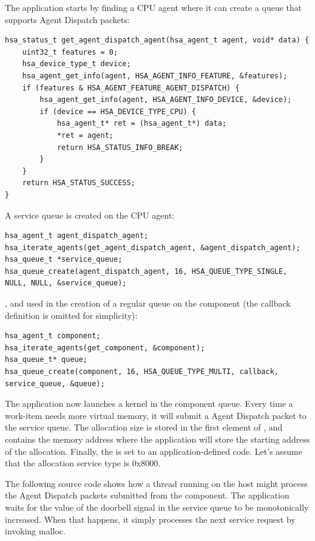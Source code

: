 \documentclass[final,oneside]{book}
\begin{document}
The application starts by finding a CPU agent where it can create a queue that
supports Agent Dispatch packets:
\begin{lstlisting}
hsa_status_t get_agent_dispatch_agent(hsa_agent_t agent, void* data) {
    uint32_t features = 0;
    hsa_device_type_t device;
    hsa_agent_get_info(agent, HSA_AGENT_INFO_FEATURE, &features);
    if (features & HSA_AGENT_FEATURE_AGENT_DISPATCH) {
        hsa_agent_get_info(agent, HSA_AGENT_INFO_DEVICE, &device);
        if (device == HSA_DEVICE_TYPE_CPU) {
            hsa_agent_t* ret = (hsa_agent_t*) data;
            *ret = agent;
            return HSA_STATUS_INFO_BREAK;
        }
    }
    return HSA_STATUS_SUCCESS;
}
\end{lstlisting}
A service queue is created on the CPU agent:
\begin{lstlisting}
hsa_agent_t agent_dispatch_agent;
hsa_iterate_agents(get_agent_dispatch_agent, &agent_dispatch_agent);
hsa_queue_t *service_queue;
hsa_queue_create(agent_dispatch_agent, 16, HSA_QUEUE_TYPE_SINGLE, NULL, NULL, &service_queue);
\end{lstlisting}
, and used in the creation of a regular queue on the component (the
callback definition is omitted for simplicity):
\begin{lstlisting}
hsa_agent_t component;
hsa_iterate_agents(get_component, &component);
hsa_queue_t* queue;
hsa_queue_create(component, 16, HSA_QUEUE_TYPE_MULTI, callback, service_queue, &queue);
\end{lstlisting}
The application now launches a kernel in the component queue. Every time a
work-item needs more virtual memory, it will submit a Agent Dispatch packet to
the service queue. The allocation size is stored in the first element of
, and
 contains the memory address
where the application will store the starting address of the
allocation. Finally, the  is set to an
application-defined code. Let's assume that the allocation service type is
0x8000.

The following source code shows how a thread running on the host might process
the Agent Dispatch packets submitted from the component. The application waits
for the value of the doorbell signal in the service queue to be monotonically
increased. When that happens, it simply processes the next service request by
invoking malloc.


\end{document}
